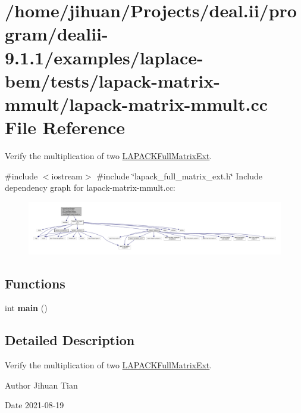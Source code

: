 \hypertarget{lapack-matrix-mmult_8cc}{}\section{/home/jihuan/\+Projects/deal.ii/program/dealii-\/9.1.1/examples/laplace-\/bem/tests/lapack-\/matrix-\/mmult/lapack-\/matrix-\/mmult.cc File Reference}
\label{lapack-matrix-mmult_8cc}


Verify the multiplication of two {\ttfamily \hyperlink{classLAPACKFullMatrixExt}{L\+A\+P\+A\+C\+K\+Full\+Matrix\+Ext}}.  


{\ttfamily \#include $<$iostream$>$}\newline
{\ttfamily \#include \char`\"{}lapack\+\_\+full\+\_\+matrix\+\_\+ext.\+h\char`\"{}}\newline
Include dependency graph for lapack-\/matrix-\/mmult.cc\+:
\nopagebreak
\begin{figure}[H]
\begin{center}
\leavevmode
\includegraphics[width=350pt]{lapack-matrix-mmult_8cc__incl}
\end{center}
\end{figure}
\subsection*{Functions}
\begin{DoxyCompactItemize}
\item 
\mbox{\label{lapack-matrix-mmult_8cc_ae66f6b31b5ad750f1fe042a706a4e3d4}} 
int {\bfseries main} ()
\end{DoxyCompactItemize}


\subsection{Detailed Description}
Verify the multiplication of two {\ttfamily \hyperlink{classLAPACKFullMatrixExt}{L\+A\+P\+A\+C\+K\+Full\+Matrix\+Ext}}. 

\begin{DoxyAuthor}{Author}
Jihuan Tian 
\end{DoxyAuthor}
\begin{DoxyDate}{Date}
2021-\/08-\/19 
\end{DoxyDate}
